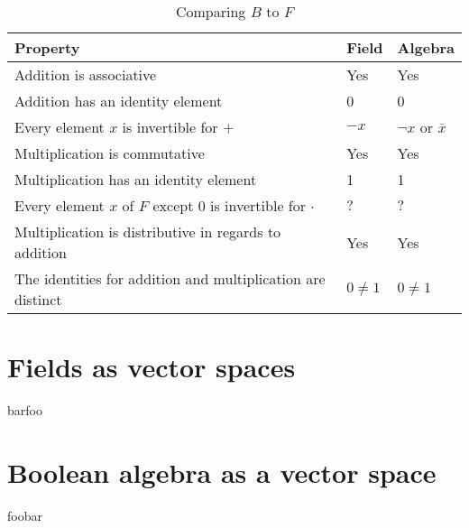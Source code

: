 \documentclass{article}
\begin{document}
\begin{table}[h]
\centering
\begin{tabular}{@{}lll@{}}
\toprule
Property                                                    & Field      & Algebra               \\ \toprule
Addition is associative                                     & Yes        & Yes                   \\ \midrule
Addition has an identity element                            & 0          & 0                     \\ \midrule
Every element $x$ is invertible for $+$                     & $-x$       & $\neg x$ or $\bar{x}$ \\ \midrule
Multiplication is commutative                               & Yes        & Yes                   \\ \midrule
Multiplication has an identity element                      & 1          & 1                     \\ \midrule
Every element $x$ of $F$ except 0 is invertible for $\cdot$ & $\text{?}$ & $\text{?}$            \\ \midrule
Multiplication is distributive in regards to addition       & Yes        & Yes                   \\ \midrule
The identities for addition and multiplication are distinct & $0 \neq 1$ & $0 \neq 1$            \\ \bottomrule
\end{tabular}
\caption{Comparing $B$ to $F$}
\label{algebrafieldproof}
\end{table}

\section{Fields as vector spaces}
\label{sec:Fields as vector spaces}

barfoo

\section{Boolean algebra as a vector space}
\label{sec:Boolean algebra as a vector space}

foobar

\newpage



\end{document}
